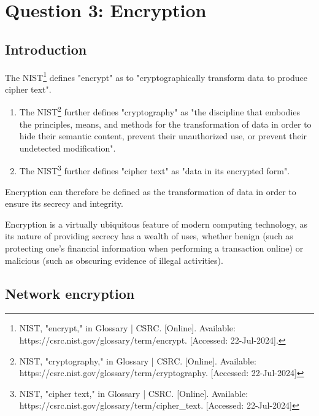 \section{Question 3: Encryption} %
\label{sec:Question 3: Encryption}

\subsection{Introduction} %
\label{sub:Introduction}

\begin{myenum}
	\item The NIST\footnote{NIST, "encrypt," in Glossary | CSRC. [Online]. Available: https://csrc.nist.gov/glossary/term/encrypt. [Accessed: 22-Jul-2024].} defines "encrypt" as to "cryptographically transform data to produce cipher text".
		\begin{enumerate}
			\item The NIST\footnote{NIST, "cryptography," in Glossary | CSRC. [Online]. Available: https://csrc.nist.gov/glossary/term/cryptography. [Accessed: 22-Jul-2024]} further defines "cryptography" as "the discipline that embodies the principles, means, and methods for the transformation of data in order to hide their semantic content, prevent their unauthorized use, or prevent their undetected modification".
			\item The NIST\footnote{NIST, "cipher text," in Glossary | CSRC. [Online]. Available: https://csrc.nist.gov/glossary/term/cipher\_text. [Accessed: 22-Jul-2024]} further defines "cipher text" as "data in its encrypted form".
		\end{enumerate}
	\item Encryption can therefore be defined as the transformation of data in order to ensure its secrecy and integrity.
	\item Encryption is a virtually ubiquitous feature of modern computing technology, as its nature of providing secrecy has a wealth of uses, whether benign (such as protecting one's financial information when performing a transaction online) or malicious (such as obscuring evidence of illegal activities).
\end{myenum}

\subsection{Network encryption} %
\label{sub:Network encryption}

